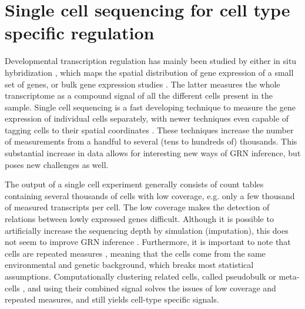 \section{Single cell sequencing for cell type specific regulation}

Developmental transcription regulation has mainly been studied by either in situ hybridization \cite{Jensen_2014}, which maps the spatial distribution of gene expression of a small set of genes, or bulk gene expression studies \cite{Wang_2009}. The latter measures the whole transcriptome as a compound signal of all the different cells present in the sample. Single cell sequencing is a fast developing technique to measure the gene expression of individual cells separately, with newer techniques even capable of tagging cells to their spatial coordinates \cite{Longo_2021,Borm_2022}. These techniques increase the number of measurements from a handful to several (tens to hundreds of) thousands. This substantial increase in data allows for interesting new ways of GRN inference, but poses new challenges as well.

The output of a single cell experiment generally consists of count tables containing several thousands of cells with low coverage, e.g. only a few thousand of measured transcripts per cell. The low coverage makes the detection of relations between lowly expressed genes difficult. Although it is possible to artificially increase the sequencing depth by simulation (imputation), this does not seem to improve GRN inference \cite{Ly_2022,McCalla_2021}. Furthermore, it is important to note that cells are repeated measures \cite{Zimmerman_2021}, meaning that the cells come from the same environmental and genetic background, which breaks most statistical assumptions. Computationally clustering related cells, called pseudobulk or meta-cells \cite{Baran_2019}, and using their combined signal solves the issues of low coverage and repeated measures, and still yields cell-type specific signals.

